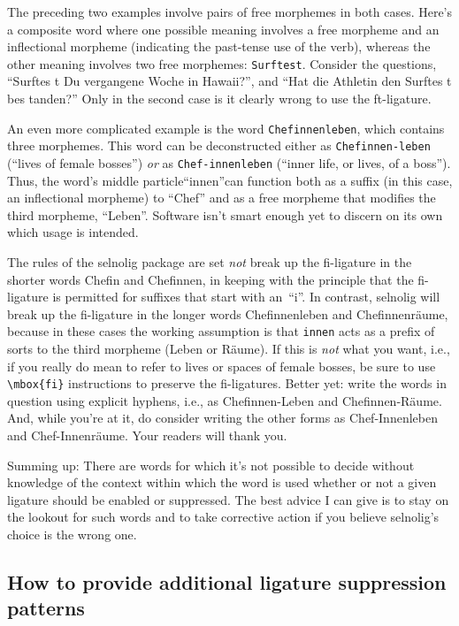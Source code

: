 \documentclass[11pt]{article}
\newcommand{\pkg}[1]{\textsf{#1}}
\newcommand{\opt}[1]{\texttt{#1}}
\begin{document}
The preceding two examples involve pairs of free morphemes in both cases. Here's a composite word where one possible meaning involves a free morpheme and an inflectional morpheme (indicating the past-tense use of the verb), whereas the other meaning involves two free morphemes: \opt{Surftest}. Consider the questions, \enquote{Surftes\kern0pt t Du vergangene Woche in Hawaii?}, and \enquote{Hat die Athletin den Surf\breaklig tes\kern0pt t bes\kern0pt tanden?} Only in the second case is it clearly wrong to use the ft-ligature.

An even more complicated example is the word \opt{Chefinnenleben}, which contains three morphemes. This word can be deconstructed either as \opt{Chefinnen-leben} (\enquote{lives of female bosses}) \emph{or} as \opt{Chef-innenleben} (\enquote{inner life, or lives, of a boss}). Thus, the word's middle particle\textemdash\enquote{innen}\textemdash can function both as a suffix (in this case, an inflectional morpheme) to \enquote{Chef} and as a free morpheme that modifies the third morpheme, \enquote{Leben}. Software isn't smart enough yet to discern on its own which usage is intended.

The rules of the \pkg{selnolig} package are set \emph{not} break up the fi-ligature in the shorter words Chefin and Chefinnen, in keeping with the principle that the fi-ligature is permitted for suffixes that start with an~\enquote{i}. In contrast, \pkg{selnolig} will break up the fi-ligature in the longer words Chefinnenleben and Chefinnenräume, because in these cases the working assumption is that \opt{innen} acts as a prefix of sorts to the third morpheme (Leben or Räume). If this is \emph{not} what you want, i.e., if you really do mean to refer to lives or spaces of female bosses, be sure to use \Verb+\mbox{fi}+ instructions to preserve the fi-ligatures. Better yet: write the words in question using explicit hyphens, i.e., as Chefinnen-Leben and Chefinnen-Räume. And, while you're at it, do consider writing the other forms as Chef-Innenleben and Chef-Innenräume. Your readers will thank you.

Summing up: There are words for which it's not possible to decide without knowledge of the context within which the word is used whether or not a given ligature should be enabled or suppressed. The best advice I can give is to stay on the lookout for such words and to take corrective action if you believe \pkg{selnolig}'s choice is the wrong one.



\subsection{How to provide additional ligature suppression patterns}
\end{document}
